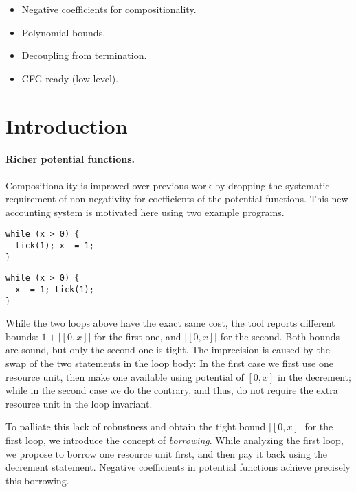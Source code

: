 \documentclass[nocopyrightspace,preprint]{sigplanconf-pldi15}
\begin{document}
\begin{itemize}
\item Negative coefficients for compositionality.
\item Polynomial bounds.
\item Decoupling from termination.
\item CFG ready (low-level).
\end{itemize}

\section{Introduction}

\paragraph{Richer potential functions.}
Compositionality is improved over previous work by dropping
the systematic requirement of non-negativity for coefficients
of the potential functions.
%
This new accounting system is motivated
here using two example programs.

\begin{minipage}[b]{.45\linewidth}
\begin{lstlisting}
while (x > 0) {
  tick(1); x -= 1;
}
\end{lstlisting}
\end{minipage}
\begin{minipage}[b]{.45\linewidth}
\begin{lstlisting}
while (x > 0) {
  x -= 1; tick(1);
}
\end{lstlisting}
\end{minipage}

While the two loops above have the exact same cost,
the tool \toolname{} reports different bounds: $1 +
|[0,x]|$ for the first one, and $|[0,x]|$ for the
second.  Both bounds are sound, but only the second
one is tight.
%
The imprecision is caused by the swap of the two
statements in the loop body:  In the first case
we first use one resource unit, then make one
available using potential of $[0,x]$ in the
decrement; while in the second case we do the
contrary, and thus, do not require the extra
resource unit in the loop invariant.

To palliate this lack of robustness and obtain the
tight bound $|[0,x]|$ for the first loop, we introduce
the concept of \emph{borrowing}.
While analyzing the first loop, we propose to borrow
one resource unit first, and then pay it back using
the decrement statement.  Negative coefficients in
potential functions achieve precisely this borrowing.
\end{document}

